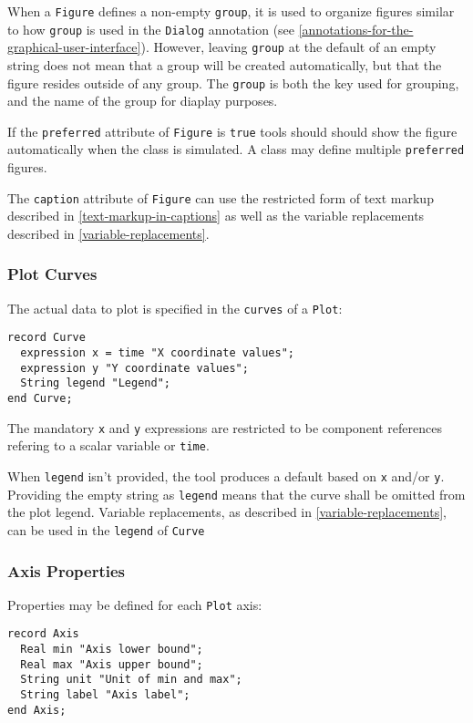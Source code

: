 When a \lstinline!Figure! defines a non-empty \lstinline!group!, it is used to
organize figures similar to how \lstinline!group! is used in the
\lstinline!Dialog! annotation (see \autoref{annotations-for-the-graphical-user-interface}).  However, leaving \lstinline!group! at
the default of an empty string does not mean that a group will be created
automatically, but that the figure resides outside of any group. The
\lstinline!group! is both the key used for grouping, and the name of the group
for diaplay purposes.

If the \lstinline!preferred! attribute of \lstinline!Figure! is \lstinline!true!
tools should should show the figure automatically when the class is simulated. A
class may define multiple \lstinline!preferred! figures.

The \lstinline!caption! attribute of \lstinline!Figure! can use the restricted
form of text markup described in \autoref{text-markup-in-captions} as well as
the variable replacements described in \autoref{variable-replacements}.

\subsubsection{Plot Curves}
The actual data to plot is specified in the \lstinline!curves! of a \lstinline!Plot!:
\begin{lstlisting}[language=modelica]
record Curve
  expression x = time "X coordinate values";
  expression y "Y coordinate values";
  String legend "Legend";
end Curve;
\end{lstlisting}

The mandatory \lstinline!x! and \lstinline!y! expressions are restricted to be
component references refering to a scalar variable or \lstinline!time!.

When \lstinline!legend! isn't provided, the tool produces a default based on
\lstinline!x! and/or \lstinline!y!.  Providing the empty string as
\lstinline!legend! means that the curve shall be omitted from the plot legend.
Variable replacements, as described in \autoref{variable-replacements}, can be
used in the \lstinline!legend! of \lstinline!Curve!

\subsubsection{Axis Properties}
Properties may be defined for each \lstinline!Plot! axis:
\begin{lstlisting}[language=modelica]
record Axis
  Real min "Axis lower bound";
  Real max "Axis upper bound";
  String unit "Unit of min and max";
  String label "Axis label";
end Axis;
\end{lstlisting}

